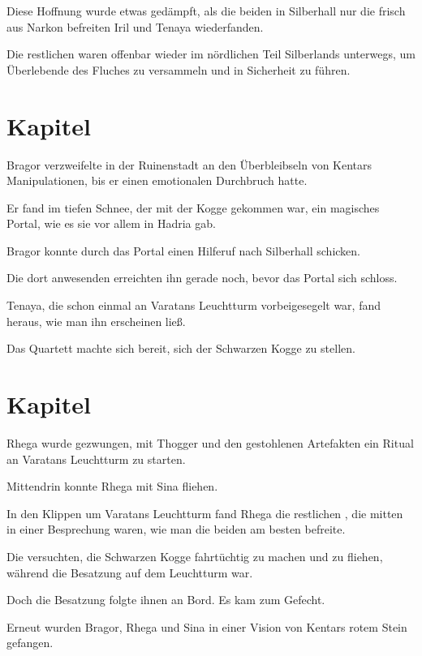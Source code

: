 Diese Hoffnung wurde etwas gedämpft, als die beiden in Silberhall nur die frisch aus Narkon befreiten Iril und Tenaya wiederfanden. 

Die restlichen  waren offenbar wieder im nördlichen Teil Silberlands unterwegs, um Überlebende des Fluches zu versammeln und in Sicherheit zu führen.


\newpage
\section{Kapitel}

Bragor verzweifelte in der Ruinenstadt an den Überbleibseln von Kentars Manipulationen, bis er einen emotionalen Durchbruch hatte.

Er fand im tiefen Schnee, der mit der Kogge gekommen war, ein magisches Portal, wie es sie vor allem in Hadria gab.

Bragor konnte durch das Portal einen Hilferuf nach Silberhall schicken.

Die dort anwesenden  erreichten ihn gerade noch, bevor das Portal sich schloss.

Tenaya, die schon einmal an Varatans Leuchtturm vorbeigesegelt war, fand heraus, wie man ihn erscheinen ließ.

Das Quartett machte sich bereit, sich der Schwarzen Kogge zu stellen.

\newpage
\section{Kapitel}

Rhega wurde gezwungen, mit Thogger und den gestohlenen Artefakten ein Ritual an Varatans Leuchtturm zu starten.

Mittendrin konnte Rhega mit Sina fliehen.

In den Klippen um Varatans Leuchtturm fand Rhega die restlichen , die mitten in einer Besprechung waren, wie man die beiden am besten befreite.

Die  versuchten, die Schwarzen Kogge fahrtüchtig zu machen und zu fliehen, während die Besatzung auf dem Leuchtturm war. 

Doch die Besatzung folgte ihnen an Bord. Es kam zum Gefecht.

Erneut wurden Bragor, Rhega und Sina in einer Vision von Kentars rotem Stein gefangen.

